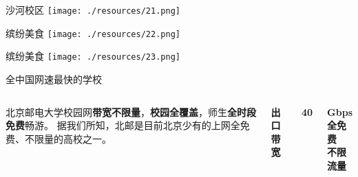 \documentclass[aspectratio=169, utf8]{beamer}
\begin{document}
\begin{frame}{沙河校区}
    \centering
    \texttt{[image: ./resources/21.png]}
\end{frame}

\begin{frame}{缤纷美食}
    \centering
    \texttt{[image: ./resources/22.png]}
\end{frame}

\begin{frame}{缤纷美食}
    \centering
    \texttt{[image: ./resources/23.png]}
\end{frame}

\begin{frame}{全中国网速最快的学校}
    \begin{columns}
        \setlength{\parindent}{2em}

        北京邮电大学校园网\textcolor{Fore}{\textbf{带宽不限量}}，\textcolor{Fore}{\textbf{校园全覆盖}}，师生\textcolor{Fore}{\textbf{全时段免费}}畅游。
        据我们所知，北邮是目前北京少有的上网全免费、不限量的高校之一。

        \centering
        \textcolor{Fore}{\textbf{出口带宽}}

        \Huge \textcolor{Fore}{\textbf{40}}

        \Large \textcolor{Fore}{\textbf{Gbps}}\\[1em]

        \normalsize \textcolor{Fore}{\textbf{全免费\\不限流量}}
    \end{columns}
\end{frame}
\end{document}
